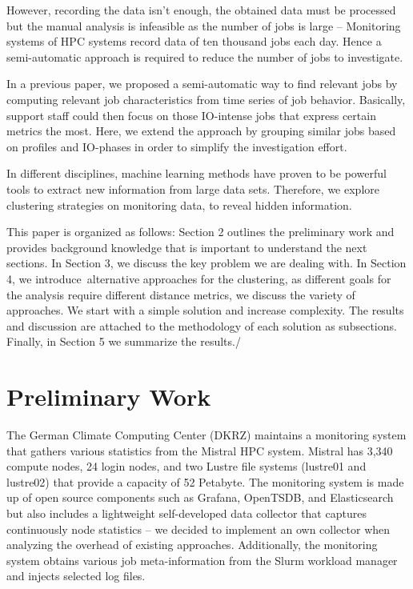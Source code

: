 \documentclass[]{llncs}
\begin{document}
However, recording the data isn’t enough, the obtained data must be processed but the manual analysis is infeasible as the number of jobs is large -- Monitoring systems of HPC systems record data of ten thousand jobs each day.
Hence a semi-automatic approach is required to reduce the number of jobs to investigate.

In a previous paper, we proposed a semi-automatic way to find relevant jobs by computing relevant job characteristics from time series of job behavior.
Basically, support staff could then focus on those IO-intense jobs that express certain metrics the most.
Here, we extend the approach by grouping similar jobs based on profiles and IO-phases in order to simplify the investigation effort.

In different disciplines, machine learning methods have proven to be powerful tools to extract new information from large data sets.
Therefore, we explore clustering strategies on monitoring data, to reveal hidden information.

This paper is organized as follows: Section 2 outlines the preliminary work and provides background knowledge that is important to understand the next sections.
In Section 3, we discuss the key problem we are dealing with.
In Section 4, we introduce\ alternative approaches for the clustering, as different goals for the analysis require different distance metrics, we discuss the variety of approaches.
 We start with a simple solution and increase complexity.
The results and discussion are attached to the methodology of each solution as subsections.
Finally, in Section 5 we summarize the results./


\section{Preliminary Work}
The German Climate Computing Center (DKRZ) maintains a monitoring system that gathers various statistics from the Mistral HPC system.
Mistral has 3,340 compute nodes, 24 login nodes, and two Lustre file systems (lustre01 and lustre02) that provide a capacity of 52 Petabyte.
The monitoring system is made up of open source components such as Grafana, OpenTSDB, and Elasticsearch but also includes a lightweight self-developed data collector that captures continuously node statistics – we decided to implement an own collector when analyzing the overhead of existing approaches.
Additionally, the monitoring system obtains various job meta-information from the Slurm workload manager and injects selected log files.
\end{document}

